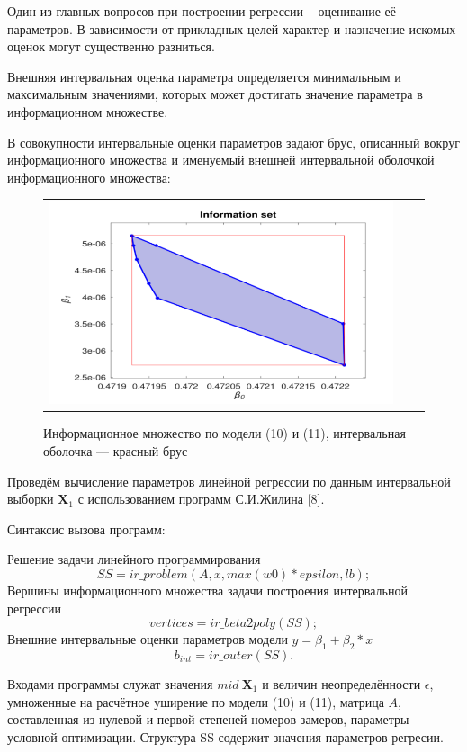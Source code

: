 \documentclass[a4paper,14pt]{article}
\begin{document}
	Один из главных вопросов при построении регрессии – оценивание
	её параметров. В зависимости от прикладных целей характер и назначение искомых оценок могут существенно разниться.
	
	Внешняя интервальная оценка параметра определяется минимальным и максимальным значениями, которых может достигать значение
	параметра в информационном множестве.
	
	В совокупности интервальные оценки параметров задают брус, описанный вокруг информационного множества и именуемый внешней интервальной оболочкой информационного множества:
	
	\begin{figure}[H]
		\begin{center}
			\begin{tabular}{ccc}
				\includegraphics[scale=0.8]{../image/problem8.png}
			\end{tabular}
		\end{center}
		\caption{Информационное множество по модели (10) и (11), интервальная оболочка — красный брус} 
	\end{figure}

	Проведём вычисление параметров линейной регрессии по данным
	интервальной выборки $\textbf{X}_1$ с использованием программ С.И.Жилина
	[8].
	
	Синтаксис вызова программ:
	
	Решение задачи линейного программирования
	$$SS = ir\_problem(A, x, max(w0)*epsilon, lb);$$
	Вершины информационного множества задачи
	построения интервальной регрессии
	$$vertices = ir\_beta2poly(SS);$$
	Внешние интервальные оценки параметров
	модели $y = \beta_1 + \beta_2 * x$
	$$b_{int} = ir\_outer(SS).$$
	
	Входами программы служат значения $mid\:\textbf{X}_1$ и величин неопределённости $\epsilon$, умноженные на расчётное уширение по модели (10) и (11), матрица $A$, составленная из нулевой и первой степеней номеров
	замеров, параметры условной оптимизации. Структура SS содержит
	значения параметров регресии.
	
\end{document}

